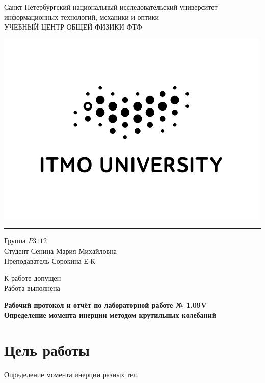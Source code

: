 \documentclass[a4paper]{article}
\begin{document}
\begin{minipage}{0.8\textwidth}
\begin{center}
    \large{Санкт-Петербургский национальный исследовательский университет информационных технологий, механики и оптики
\\УЧЕБНЫЙ ЦЕНТР ОБЩЕЙ ФИЗИКИ ФТФ}
\medbreak
\end{center}
\end{minipage}
\hfill
\begin{minipage}{0.3\textwidth}
\includegraphics[scale=0.4]{itmo.jpg}
\end{minipage}

\noindent\rule{\textwidth}{1pt}
\medbreak
\begin{minipage}{0.5\textwidth}
Группа $\textit{P3112}$						
\\Студент $\textit{Сенина Мария Михайловна}$			
\\Преподаватель $\textit{Сорокина Е К}$
\end{minipage}
\hfill
\begin{minipage}{0.4\textwidth}
К работе допущен
\\Работа выполнена
\end{minipage}

\bigbreak

\begin{center}
        \Large{\textbf{Рабочий протокол и отчёт по лабораторной работе № 1.09V}}
   \LARGE{\textbf{\\Определение момента инерции методом
крутильных колебаний}}
\end{center}

\section{Цель работы}
Определение момента инерции разных тел.
\end{document}
